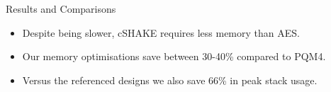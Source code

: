 \documentclass{beamer}            %
\begin{document}
\begin{frame}{Results and Comparisons}

\begin{itemize}
\item Despite being slower, cSHAKE requires less memory than AES.

\item Our memory optimisations save between 30-40\% compared to PQM4.

\item Versus the referenced designs we also save 66\% in peak stack usage.

\end{itemize}

\begin{table}[tbhp]
\centering
\caption{\footnotesize Stack usage in bytes for our microcontroller implementations.}
\end{table}

\end{frame}

\end{document}
